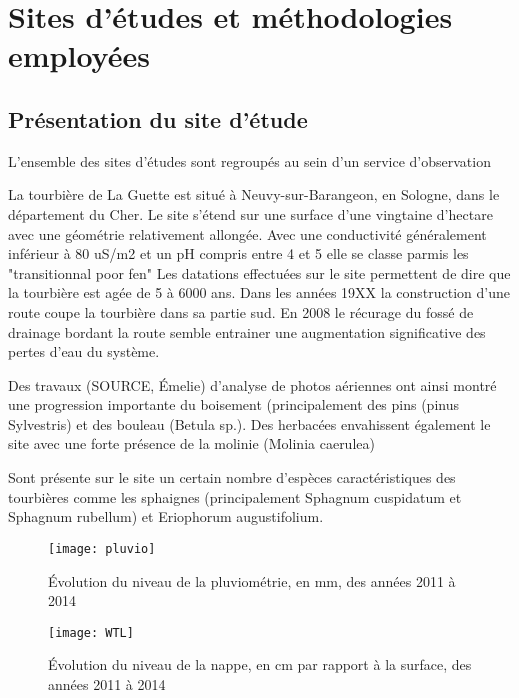 
\chapter{Sites d'études et méthodologies employées}
\newpage

\section{Présentation du site d'étude}

L'ensemble des sites d'études sont regroupés au sein d'un service d'observation


La tourbière de La Guette est situé à Neuvy-sur-Barangeon, en Sologne, dans le département du Cher.
Le site s'étend sur une surface d'une vingtaine d'hectare avec une géométrie relativement allongée.
Avec une conductivité généralement inférieur à 80 uS/m2 et un pH compris entre 4 et 5 elle se classe parmis les "transitionnal poor fen"
Les datations effectuées sur le site permettent de dire que la tourbière est agée de 5 à 6000 ans.
Dans les années 19XX la construction d'une route coupe la tourbière dans sa partie sud.
En 2008 le récurage du fossé de drainage bordant la route semble entrainer une augmentation significative des pertes d'eau du système.

Des travaux (SOURCE, Émelie) d'analyse de photos aériennes ont ainsi montré une progression importante du boisement (principalement des pins (pinus Sylvestris) et des bouleau (Betula sp.). Des herbacées envahissent également le site avec une forte présence de la molinie (Molinia caerulea)

Sont présente sur le site un certain nombre d'espèces caractéristiques des tourbières comme les sphaignes (principalement Sphagnum cuspidatum et Sphagnum rubellum) et Eriophorum augustifolium.

\begin{figure}
\centering
\texttt{[image: pluvio]}
\caption{Évolution du niveau de la pluviométrie, en \si{\mm}, des années 2011 à 2014}
\label{fig:pluvio}
\end{figure}

\begin{figure}
\centering
\texttt{[image: WTL]}
\caption{Évolution du niveau de la nappe, en cm par rapport à la surface, des années 2011 à 2014}
\label{fig:WTL}
\end{figure}

